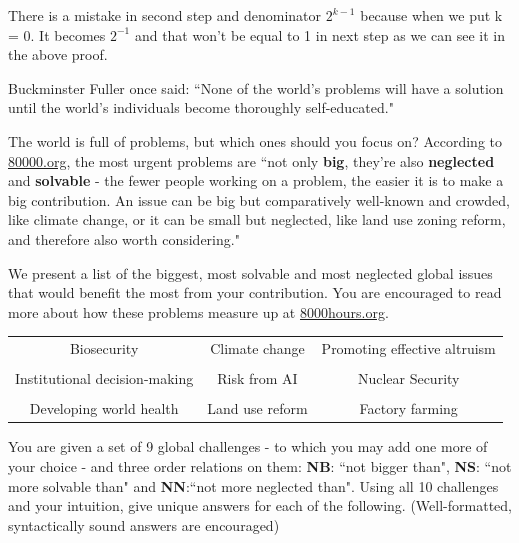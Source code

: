 \documentclass[addpoints]{exam}
\begin{document}
\begin{questions}
\begin{parts}
  \begin{solution}
    There is a mistake in second step and denominator ${2^{k-1}}$  because when we put k = 0. It becomes $2^{-1}$ and that won't be equal to 1 in next step as we can see it in the above proof. 
  \end{solution}
\end{parts}

\question Buckminster Fuller once said: ``None of the world’s problems will have a solution until the world’s individuals become thoroughly self-educated."

The world is full of problems, but which ones should you focus on? According to \href{http://8000hours.org}{80000.org}, the most urgent problems are ``not only \textbf{big}, they're also \textbf{neglected} and \textbf{solvable} - the fewer people working on a problem, the easier it is to make a big contribution. An issue can be big but comparatively well-known and crowded, like climate change, or it can be small but neglected, like land use zoning reform, and therefore also worth considering."

We present a list of the biggest, most solvable and most neglected global issues that would benefit the most from your contribution. You are encouraged to read more about how these problems measure up at \href{https://80000hours.org/articles/cause-selection/}{8000hours.org}.
\begin{center}
\begin{tabular}{ c c c}
Biosecurity & Climate change & Promoting effective altruism\\\\
Institutional decision-making & Risk from AI & Nuclear Security\\\\
Developing world health & Land use reform & Factory farming
\end{tabular}
\end{center}

You are given a set of 9 global challenges - to which you may add one more of your choice - and three order relations on them: \textbf{NB}: ``not bigger than", \textbf{NS}: ``not more solvable than" and \textbf{NN}:``not more neglected than". Using all 10 challenges and your intuition, give unique answers for each of the following. (Well-formatted, syntactically sound answers are encouraged) 

\end{questions}
\end{document}
